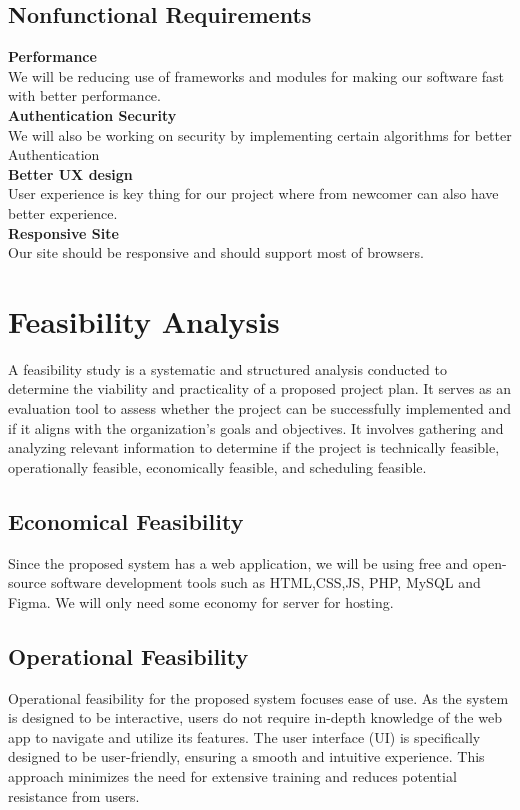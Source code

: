 \subsection{Nonfunctional Requirements}
\textbf{Performance}\\
We will be reducing use of frameworks and modules for making our software fast with better performance.\\
\textbf{Authentication Security}\\
We will also be working on security by implementing certain algorithms for better Authentication\\
\textbf{Better UX design}\\
User experience is key thing for our project where from  newcomer can also have better experience.\\
\textbf{Responsive Site}\\
Our site should be responsive and should support most of browsers.\\
\section{Feasibility Analysis}
A feasibility study is a systematic and structured analysis conducted to determine the viability and practicality of a proposed project plan. It serves as an evaluation tool to assess whether the project can be successfully implemented and if it aligns with the organization's goals and objectives. It involves gathering and analyzing relevant information to determine if the project is technically feasible, operationally feasible, economically feasible, and scheduling feasible.
\subsection{Economical Feasibility}
Since the proposed system has a web application, we will be using free and open-source software development tools such as HTML,CSS,JS, PHP, MySQL and Figma. We will only need some economy for server for hosting.
\subsection{Operational Feasibility}
Operational feasibility for the proposed system focuses ease of use. As the system is designed to be interactive, users do not require in-depth knowledge of the web app to navigate and utilize its features. The user interface (UI) is specifically designed to be user-friendly, ensuring a smooth and intuitive experience. This approach minimizes the need for extensive training and reduces potential resistance from users.  
